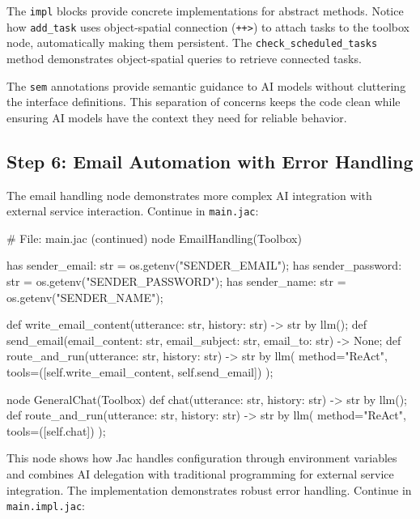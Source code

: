 The \texttt{impl} blocks provide concrete implementations for abstract methods. Notice how \texttt{add\_task} uses object-spatial connection (\texttt{++>}) to attach tasks to the toolbox node, automatically making them persistent. The \texttt{check\_scheduled\_tasks} method demonstrates object-spatial queries to retrieve connected tasks.

The \texttt{sem} annotations provide semantic guidance to AI models without cluttering the interface definitions. This separation of concerns keeps the code clean while ensuring AI models have the context they need for reliable behavior.

\subsection{Step 6: Email Automation with Error Handling}

The email handling node demonstrates more complex AI integration with external service interaction. Continue in \texttt{main.jac}:

\begin{jacblock}
# File: main.jac (continued)
node EmailHandling(Toolbox) {
    has sender_email: str = os.getenv("SENDER_EMAIL");
    has sender_password: str = os.getenv("SENDER_PASSWORD");
    has sender_name: str = os.getenv("SENDER_NAME");

    def write_email_content(utterance: str, history: str) -> str by llm();
    def send_email(email_content: str, email_subject: str, email_to: str) -> None;
    def route_and_run(utterance: str, history: str) -> str by llm(
        method="ReAct",
        tools=([self.write_email_content, self.send_email])
    );
}

node GeneralChat(Toolbox) {
    def chat(utterance: str, history: str) -> str by llm();
    def route_and_run(utterance: str, history: str) -> str by llm(
        method="ReAct",
        tools=([self.chat])
    );
}
\end{jacblock}

This node shows how Jac handles configuration through environment variables and combines AI delegation with traditional programming for external service integration. The implementation demonstrates robust error handling. Continue in \texttt{main.impl.jac}:

